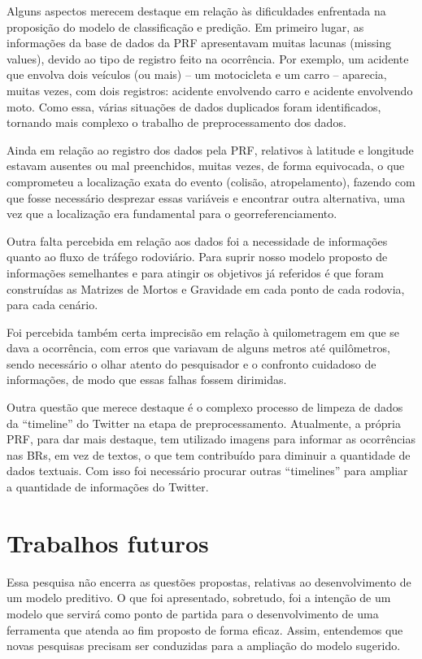 Alguns aspectos merecem destaque em relação às dificuldades enfrentada na proposição do modelo de classificação e predição. Em primeiro lugar, as informações da base de dados da PRF apresentavam muitas lacunas (missing values), devido ao tipo de registro feito na ocorrência. Por exemplo, um acidente que envolva dois veículos (ou mais) -- um motocicleta e um carro -- aparecia, muitas vezes, com dois registros: acidente envolvendo carro e acidente envolvendo moto. Como essa, várias situações de dados duplicados foram identificados, tornando mais complexo o trabalho de preprocessamento dos dados.

Ainda em relação ao registro dos dados pela PRF, relativos à latitude e longitude estavam ausentes ou mal preenchidos, muitas vezes, de forma equivocada, o que comprometeu a localização exata do evento (colisão, atropelamento), fazendo com que fosse necessário desprezar essas variáveis e encontrar outra alternativa, uma vez que a localização era fundamental para o georreferenciamento.

Outra falta percebida em relação aos dados foi a necessidade de informações quanto ao fluxo de tráfego rodoviário. Para suprir nosso modelo proposto de informações semelhantes e para atingir os objetivos já referidos é que foram construídas as Matrizes de Mortos e Gravidade em cada ponto de cada rodovia, para cada cenário.

Foi percebida também certa imprecisão em relação à quilometragem em que se dava a ocorrência, com erros que variavam de alguns metros até quilômetros, sendo necessário o olhar atento do pesquisador e o confronto cuidadoso de informações, de modo que essas falhas fossem dirimidas.

Outra questão que merece destaque é o complexo processo de limpeza de dados da ``timeline'' do Twitter na etapa de preprocessamento. Atualmente, a própria PRF, para dar mais destaque, tem utilizado imagens para informar as ocorrências nas BRs, em vez de textos, o que tem contribuído para diminuir a quantidade de dados textuais. Com isso foi necessário procurar outras ``timelines'' para ampliar a quantidade de informações do Twitter.


\section{Trabalhos futuros}

Essa pesquisa não encerra as questões propostas, relativas ao desenvolvimento de um modelo preditivo. O que foi apresentado, sobretudo, foi a intenção de um modelo que servirá como ponto de partida para o desenvolvimento de uma ferramenta que atenda ao fim proposto de forma eficaz. Assim, entendemos que novas pesquisas precisam ser conduzidas para a ampliação do modelo sugerido. 

